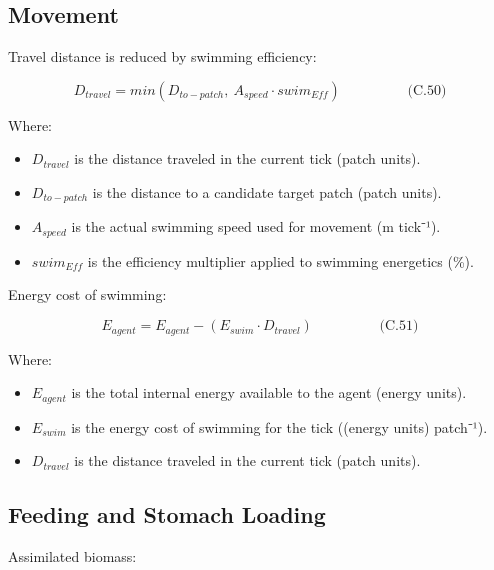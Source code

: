 \documentclass[
]{book}
\providecommand{\tightlist}{%
  \setlength{\itemsep}{0pt}\setlength{\parskip}{0pt}}
\begin{document}
\subsection{Movement}\label{movement}

Travel distance is reduced by swimming efficiency:

\[
\begin{equation} D_{travel} = min(D_{to-patch},\ A_{speed} \cdot swim_{Eff})  \hspace{2cm} \text{(C.50)} \end{equation}
\]

Where:

\begin{itemize}
\tightlist
\item
  \(D_{travel}\) is the distance traveled in the current tick (patch
  units).
\item
  \(D_{to-patch}\) is the distance to a candidate target patch (patch
  units).
\item
  \(A_{speed}\) is the actual swimming speed used for movement (m
  tick⁻¹).
\item
  \(swim_{Eff}\) is the efficiency multiplier applied to swimming
  energetics (\%).
\end{itemize}

Energy cost of swimming:

\[
\begin{equation} E_{agent} = E_{agent} - (E_{swim} \cdot D_{travel})  \hspace{2cm} \text{(C.51)} \end{equation}
\]

Where:

\begin{itemize}
\tightlist
\item
  \(E_{agent}\) is the total internal energy available to the agent
  (energy units).
\item
  \(E_{swim}\) is the energy cost of swimming for the tick ((energy
  units) patch⁻¹).
\item
  \(D_{travel}\) is the distance traveled in the current tick (patch
  units).
\end{itemize}

\subsection{Feeding and Stomach Loading}\label{feeding-and-stomach-loading}

Assimilated biomass:
\end{document}

